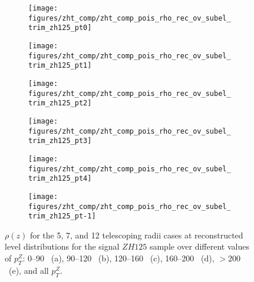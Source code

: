 \begin{figure}[!htbp]\captionsetup{justification=centering}
\begin{center}
\begin{subfigure}[t]{16pc}\centering\texttt{[image: figures/zht\_comp/zht\_comp\_pois\_rho\_rec\_ov\_subel\_trim\_zh125\_pt0]}\caption{}\end{subfigure}
\begin{subfigure}[t]{16pc}\centering\texttt{[image: figures/zht\_comp/zht\_comp\_pois\_rho\_rec\_ov\_subel\_trim\_zh125\_pt1]}\caption{}\end{subfigure}
\begin{subfigure}[t]{16pc}\centering\texttt{[image: figures/zht\_comp/zht\_comp\_pois\_rho\_rec\_ov\_subel\_trim\_zh125\_pt2]}\caption{}\end{subfigure}
\begin{subfigure}[t]{16pc}\centering\texttt{[image: figures/zht\_comp/zht\_comp\_pois\_rho\_rec\_ov\_subel\_trim\_zh125\_pt3]}\caption{}\end{subfigure}
\begin{subfigure}[t]{16pc}\centering\texttt{[image: figures/zht\_comp/zht\_comp\_pois\_rho\_rec\_ov\_subel\_trim\_zh125\_pt4]}\caption{}\end{subfigure}
\begin{subfigure}[t]{16pc}\centering\texttt{[image: figures/zht\_comp/zht\_comp\_pois\_rho\_rec\_ov\_subel\_trim\_zh125\_pt-1]}\caption{}\end{subfigure}
\caption{\label{fig:comprhozh125rec} $\rho\left(z\right)$ for the 5, 7, and 12 telescoping radii cases at reconstructed level distributions for the signal $ZH125$ sample over different values of $p_T^Z$: 0--90 \GeV\ (a), 90--120 \GeV\ (b), 120--160 \GeV\ (c), 160--200 \GeV\ (d), $>200$ \GeV\ (e), and all $p_T^Z$.}
\end{center}
\end{figure}
\clearpage

